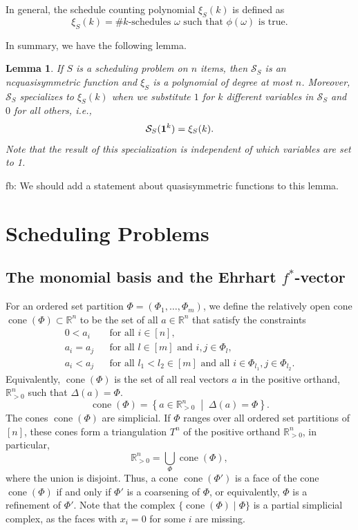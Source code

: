 \documentclass[12pt,reqno]{amsart}
\numberwithin{definition}{section}
\newtheorem{lemma}[definition]{Lemma}
\theoremstyle{definition}
\newcommand{\RR}{\mathbb{R}}
\newcommand{\SSS}{\mathcal{S}}
\newcommand{\cone}{\operatorname{cone}}
\newcommand{\mset}[2]{ \left\{ #1 \; \middle| \; #2 \right\}}
\newcommand{\comment}[1]{\textsf{\footnotesize #1}}
\begin{document}
In general, the schedule counting polynomial $\xi_S(k)$ is defined as
\[
  \xi_S(k) = \# \text{$k$-schedules $\omega$ such that $\phi(\omega)$ is true}.
\]

In summary, we have the following lemma.

\begin{lemma}
If $S$ is a scheduling problem on $n$ items, then $\SSS_S$ is an ncquasisymmetric function and $\xi_S$ is a polynomial of degree at most $n$. Moreover, $\SSS_S$ specializes to $\xi_S(k)$ when we substitute $1$ for $k$ different variables in $\SSS_S$ and $0$ for all others, i.e.,
\[
  \SSS_S({\bf 1}^k) = \xi_S(k).
\]
Note that the result of this specialization is independent of which variables are set to 1.
\end{lemma}

\comment{fb: We should add a statement about quasisymmetric functions to this lemma.}

\section{Scheduling Problems}
\label{sec:scheduling-problems}

\subsection{The monomial basis and the Ehrhart $f^*$-vector}

For an ordered set partition $\Phi=(\Phi_1,\ldots,\Phi_m)$, we define the relatively open cone $\cone(\Phi)\subset\RR^n$ to be the set of all $a\in\RR^n$ that satisfy the constraints
\begin{eqnarray*}
0 < a_i && \text{for all $i\in[n]$}, \\
a_i = a_j && \text{for all $l\in[m]$ and $i,j\in\Phi_l$}, \\
a_i < a_j && \text{for all $l_1 < l_2\in[m]$ and all $i\in\Phi_{l_1}, j\in\Phi_{l_2}$}.
\end{eqnarray*}
Equivalently, $\cone(\Phi)$ is the set of all real vectors $a$ in the positive orthand, $\RR_{> 0}^n$ such that $\Delta(a)=\Phi$. 
\[
\cone(\Phi) = \mset{a\in\RR_{> 0}^n}{\Delta(a)=\Phi}.
\]
The cones $\cone(\Phi)$ are simplicial. If $\Phi$ ranges over all ordered set partitions of $[n]$, these cones form a triangulation $T^n$ of the positive orthand $\RR_{> 0}^n$, in particular,
\[
  \RR_{> 0}^n = \bigcup_\Phi \cone(\Phi),
\]
where the union is disjoint. Thus, a cone $\cone(\Phi')$ is a face of the cone $\cone(\Phi)$ if and only if $\Phi'$ is a coarsening of $\Phi$, or equivalently, $\Phi$ is a refinement of $\Phi'$. Note that the complex $\{\cone(\Phi) \;|\; \Phi\}$ is a partial simplicial complex, as the faces with $x_i=0$ for some $i$ are missing.
\end{document}
